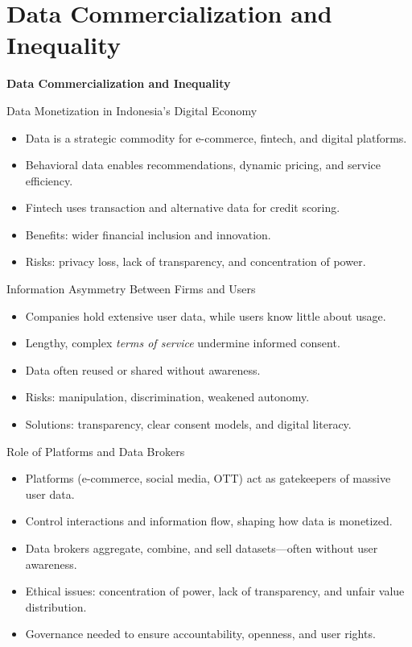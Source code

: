\documentclass[aspectratio=169, table]{beamer}
\begin{document}
\section{Data Commercialization and Inequality}

\begin{frame}{\hfill}
	\centering
	\Huge{\textbf{Data Commercialization and Inequality}}
\end{frame}

\begin{frame}{\LARGE{Data Monetization in Indonesia’s Digital Economy}}
	\vspace{20pt}
	\begin{itemize}
		\item Data is a strategic commodity for e-commerce, fintech, and digital platforms.  
		\item Behavioral data enables recommendations, dynamic pricing, and service efficiency.  
		\item Fintech uses transaction and alternative data for credit scoring.  
		\item Benefits: wider financial inclusion and innovation.  
		\item Risks: privacy loss, lack of transparency, and concentration of power.  
	\end{itemize}
\end{frame}

\begin{frame}{\LARGE{Information Asymmetry Between Firms and Users}}
	\vspace{20pt}
	\begin{itemize}
		\item Companies hold extensive user data, while users know little about usage.  
		\item Lengthy, complex \textit{terms of service} undermine informed consent.  
		\item Data often reused or shared without awareness.  
		\item Risks: manipulation, discrimination, weakened autonomy.  
		\item Solutions: transparency, clear consent models, and digital literacy.  
	\end{itemize}
\end{frame}

\begin{frame}{Role of Platforms and Data Brokers}
	\vspace{20pt}
	\begin{itemize}
		\item Platforms (e-commerce, social media, OTT) act as gatekeepers of massive user data.  
		\item Control interactions and information flow, shaping how data is monetized.  
		\item Data brokers aggregate, combine, and sell datasets—often without user awareness.  
		\item Ethical issues: concentration of power, lack of transparency, and unfair value distribution.  
		\item Governance needed to ensure accountability, openness, and user rights.  
	\end{itemize}
\end{frame}
\end{document}
